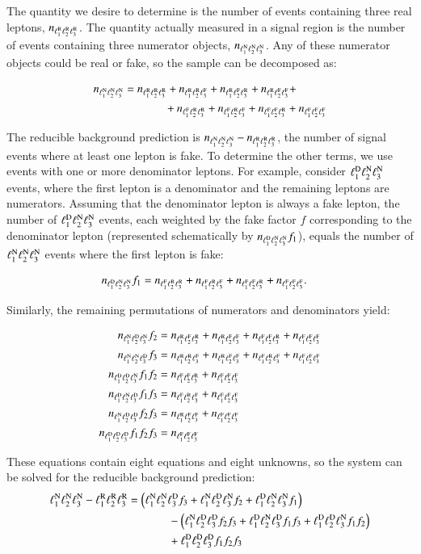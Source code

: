 The quantity we desire to determine is the number of events containing three real leptons, $n_{\RRR}$. The quantity actually measured in a signal region is the number of events containing three numerator objects, $n_{\NNN}$. Any of these numerator objects could be real or fake, so the sample can be decomposed as:

\begin{align}
	n_{\NNN} & = n_{\RRR} + n_{\RRF} + n_{\RFR} + n_{\RFF} +\\
	&  \hspace{0.5in} + n_{\FRR} + n_{\FRF} + n_{\FFR} + n_{\FFF}
\end{align}

The reducible background prediction is $n_{\NNN}-n_{\RRR}$, the number of signal events where at least one lepton is fake. To determine the other terms, we use events with one or more denominator leptons. For example, consider $\DNN$ events, where the first lepton is a denominator and the remaining leptons are numerators. Assuming that the denominator lepton is always a fake lepton, the number of $\DNN$ events, each weighted by the fake factor $f$ corresponding to the denominator lepton (represented schematically by $n_{\DNN}f_{1}$), equals the number of $\NNN$ events where the first lepton is fake:

\begin{align}
	n_{\DNN} f_{1} &= n_{\FRR} + n_{\FRF} + n_{\FFR} + n_{\FFF}.
\end{align}

Similarly, the remaining permutations of numerators and denominators yield:

\begin{align}
	n_{\NDN} f_{2} &= n_{\RFR} + n_{\RFF} + n_{\FFR} + n_{\FFF} \\
	n_{\NND} f_{3} &= n_{\RRF} + n_{\RFF} + n_{\FRF} + n_{\FFF} \\
	n_{\DDN} f_{1}f_{2} &= n_{\FFR} + n_{\FFF} \\
	n_{\DND} f_{1}f_{3} &= n_{\FRF} + n_{\FFF} \\
	n_{\NDD} f_{2}f_{3} &= n_{\RFF} + n_{\FFF} \\
	n_{\DDD} f_{1}f_{2}f_{3} &= n_{\FFF}
\end{align}

These equations contain eight equations and eight unknowns, so the system can be solved for the reducible background prediction:
\begin{align} \label{eq:fake-factor-master-formula}
	\NNN - \RRR &= \left( \NND f_{3} + \NDN f_{2}  + \DNN f_{1}\right)  \\
		 & \hspace{0.5in} - \left( \NDD f_{2}f_{3} + \DND f_{1}f_{3} + \DDN f_{1}f_{2}\right) \\
		 & \hspace{0.5in} + \DDD f_{1}f_{2}f_{3}
\end{align}

